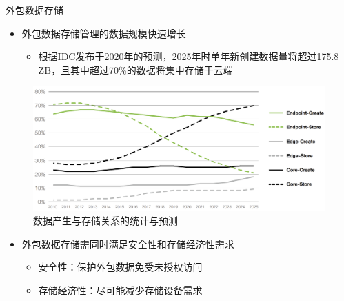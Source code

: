 \documentclass{beamer}
\begin{document}
\begin{frame}{外包数据存储}
    \begin{itemize}
        \item 外包数据存储管理的数据规模快速增长
              \begin{itemize}
                  \item 根据IDC发布于2020年的预测，2025年时单年新创建数据量将超过175.8\,ZB，且其中超过70\%的数据将集中存储于云端
              \end{itemize}
    \end{itemize}
    \vspace{-1em}
    \begin{figure}[!htb]
        \centering
        \includegraphics[width=0.8\linewidth]{./pic/dataStore.png}
        \vspace{-5pt}
        \caption{数据产生与存储关系的统计与预测}
        \label{fig:dataCreateAndStore}
    \end{figure}
    \vspace{-1.5em}
    \begin{itemize}
        \item  外包数据存储需同时满足安全性和存储经济性需求
              \begin{itemize}
                  \item 安全性：保护外包数据免受未授权访问
                  \item 存储经济性：尽可能减少存储设备需求
              \end{itemize}
    \end{itemize}
\end{frame}
\end{document}
